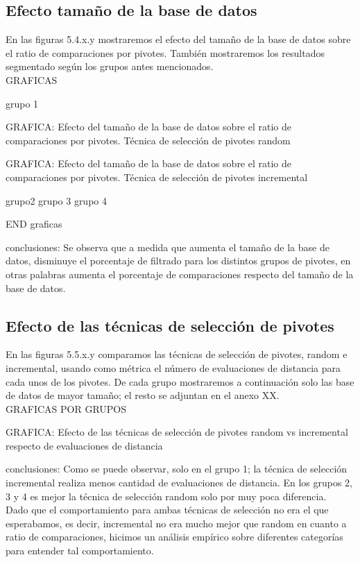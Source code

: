 \subsection{Efecto tamaño de la base de datos}

En las figuras 5.4.x.y mostraremos el efecto del tamaño de la base de datos sobre el ratio de comparaciones por pivotes. Tambi\'en mostraremos los resultados segmentado seg\'un los grupos antes mencionados.\\

GRAFICAS

grupo 1

GRAFICA: Efecto del tamaño de la base de datos sobre el ratio de comparaciones por pivotes. T\'ecnica de selecci\'on de pivotes random

GRAFICA:  Efecto del tamaño de la base de datos sobre el ratio de comparaciones por pivotes. T\'ecnica de selecci\'on de pivotes incremental


grupo2
grupo 3
grupo 4 

END graficas

conclusiones:
Se observa que a medida que aumenta el tamaño de la base de datos, disminuye el porcentaje de filtrado para los distintos grupos de pivotes, en otras palabras aumenta el porcentaje de comparaciones respecto del tamaño de la base de datos.\\

\subsection{Efecto de las t\'ecnicas de selecci\'on de pivotes}

En las figuras 5.5.x.y comparamos las t\'ecnicas de selecci\'on de pivotes, random e incremental, usando como m\'etrica el n\'umero de evaluaciones de distancia para cada unos de los pivotes. De cada grupo mostraremos a continuaci\'on solo las base de datos de mayor tamaño; el resto se adjuntan en el anexo XX.\\

GRAFICAS POR GRUPOS

 GRAFICA: Efecto de las t\'ecnicas de selecci\'on de pivotes random vs incremental respecto de evaluaciones de distancia
 
 conclusiones:
 Como se puede observar, solo en el grupo 1; la t\'ecnica de selecci\'on incremental realiza menos cantidad de evaluaciones de distancia. En los grupos 2, 3 y 4 es mejor la t\'ecnica de selecci\'on random solo por muy poca diferencia.\\
 
 
Dado que el comportamiento para ambas t\'ecnicas de selecci\'on no era el que esperabamos, es decir, incremental no era mucho mejor que random en cuanto a ratio de comparaciones, hicimos un an\'alisis emp\'irico sobre diferentes categor\'ias para entender tal comportamiento. 




 